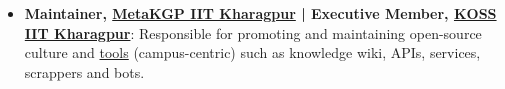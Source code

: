 \documentclass[a4paper,10pt]{extarticle} %
\begin{document}
\begin{itemize}[leftmargin=0.55cm, rightmargin=0.2cm, label={\Large\textbullet}]

\item \textbf{Maintainer, \href{https://wiki.metakgp.org/w/Metakgp:About}{MetaKGP IIT Kharagpur} | Executive Member, \href{https://kossiitkgp.org/about/index.html}{KOSS IIT Kharagpur}}: Responsible for promoting and maintaining open-source culture and \href{https://github.com/metakgp/}{tools} (campus-centric) such as knowledge wiki, APIs, services, scrappers and bots.
\end{itemize}







\end{document}

